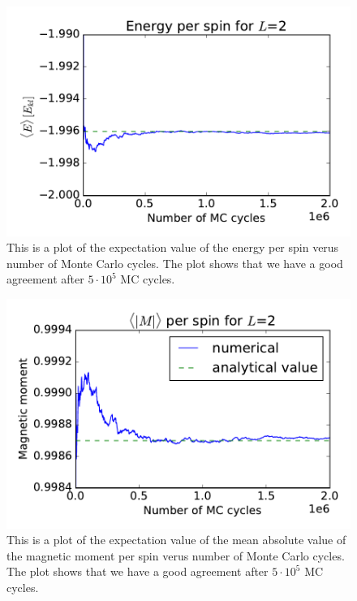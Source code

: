 \begin{figure}[H]
\includegraphics[width=\linewidth]{../results/4b/L_2_energy}\caption{This is a plot of the expectation value of the energy per spin verus number of Monte Carlo cycles. The plot shows that we have a good agreement after $ 5 \cdot 10^{5} $ MC cycles.}\label{fig:L_2_energy}
\end{figure}

\begin{figure}[H]
\includegraphics[width=\linewidth]{../results/4b/L_2_magnetic_abs}\caption{This is a plot of the expectation value of the mean absolute value of the magnetic moment per spin verus number of Monte Carlo cycles. The plot shows that we have a good agreement after $ 5 \cdot 10^{5} $ MC cycles.}\label{fig:L_2_magnetic_abs}
\end{figure}

